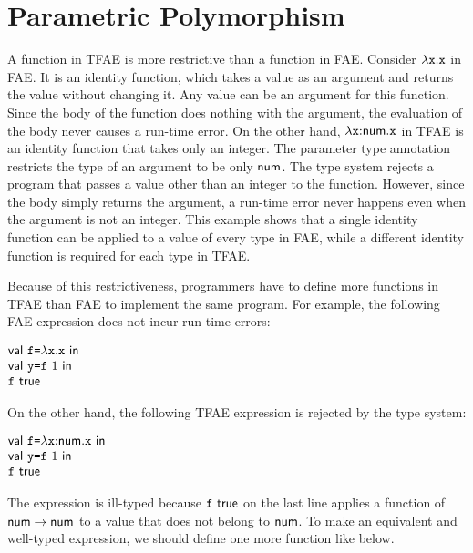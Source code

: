 \setchapterpreamble[u]{\margintoc}
\chapter{Parametric Polymorphism}

\renewcommand{\plang}{\textsf{TFAE}\xspace}
\renewcommand{\lang}{\textsf{PTFAE}\xspace}

A function in \plang is more restrictive than a function in \textsf{FAE}. Consider
$\lambda\texttt{x}.\texttt{x}$ in \textsf{FAE}. It is an identity function, which takes a value as an
argument and returns the value without changing it. Any value can be an argument
for this function. Since the body of the function does nothing with the argument,
the evaluation of the body never causes a run-time error. On the other hand,
$\lambda\texttt{x}{:}\textsf{num}.\texttt{x}$ in \plang is an identity function that takes only an
integer. The parameter type annotation restricts the type of an argument to be
only $\textsf{num}$. The type system rejects a program that passes a value other than
an integer to the function. However, since the body simply returns the argument,
a run-time error never happens even when the argument is not an integer.
This example shows that a single identity function can be applied to a value of
every type in \textsf{FAE}, while a different identity function is required for
each type in \plang.

Because of this restrictiveness, programmers have to define more functions in
\plang than \textsf{FAE} to implement the same program. For example, the
following \textsf{FAE} expression does not incur run-time errors:

$
  \begin{array}{@{}l}
    \ebind{\cf}{\efun{\cx}{\cx}}{\\
    \ebind{\cy}{\cf\ 1}{\\
    \cf\ \textsf{true}
    }}
  \end{array}
$

On the other hand, the following \plang expression is rejected by the type
system:

$
  \begin{array}{@{}l}
    \ebind{\cf}{\efunt{\cx}{\tnum}{\cx}}{\\
    \ebind{\cy}{\cf\ 1}{\\
    \cf\ \textsf{true}
    }}
  \end{array}
$

The expression is ill-typed because $\cf\ \textsf{true}$ on the last line
applies a function of $\textsf{num}\rightarrow\textsf{num}$ to a value that does not belong to
$\textsf{num}$. To make an equivalent and well-typed expression, we should define
one more function like below.

